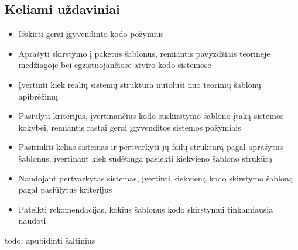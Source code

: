 \subsection{Keliami uždaviniai}
\begin{itemize}
    \item Išskirti gerai įgyvendinto kodo požymius
    \item  Aprašyti skirstymo į paketus šablonus, remiantis pavyzdžiais teorinėje medžiagoje bei
egzistuojančiose atviro kodo sistemose
    \item  Įvertinti kiek realių sistemų struktūra nutolusi nuo teorinių šablonų apibrėžimų
    \item  Pasiūlyti kriterijus, įvertinančius kodo suskirstymo šablono įtaką sistemos kokybei, remiantis
rastai gerai įgyvenditos sistemos požymiais
    \item  Pasirinkti kelias sistemas ir pertvarkyti jų failų struktūrą pagal aprašytus šablonus, įvertinant
kiek sudėtinga pasiekti kiekvieno šablono strukūrą
    \item  Naudojant pertvarkytas sistemas, įvertinti kiekvieną kodo skirstymo šabloną pagal pasiūlytus kriterijus
    \item  Pateikti rekomendacijas, kokius šablonus kodo skirstymui tinkamiausia naudoti
\end{itemize}
todo: apubidinti šaltinius

